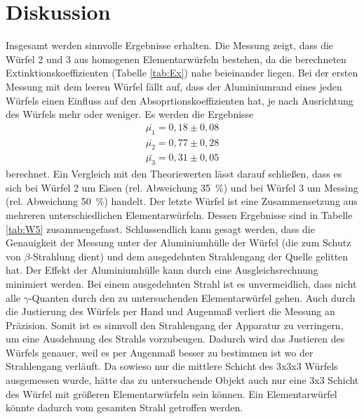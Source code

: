 \section{Diskussion}
\label{sec:Diskussion}
Insgesamt werden sinnvolle Ergebnisse erhalten.
Die Messung zeigt, dass die Würfel 2 und 3 aus homogenen Elementarwürfeln bestehen, da die berechneten Extinktionskoeffizienten (Tabelle \ref{tab:Ex}) nahe beieinander liegen.
Bei der ersten Messung mit dem leeren Würfel fällt auf, dass der Aluminiumrand eines jeden Würfels einen Einfluss auf den Absoprtionskoeffizienten hat, je nach Ausrichtung des Würfels mehr oder weniger.
Es werden die Ergebnisse 
\begin{align*}
    \bar{\mu_1}=0,18\pm0,08\\
    \bar{\mu_2}=0,77\pm0,28\\
    \bar{\mu_3}=0,31\pm0,05
\end{align*}
berechnet.
Ein Vergleich mit den Theoriewerten lässt darauf schließen, dass es sich bei Würfel 2 um Eisen (rel. Abweichung \SI{35}{\percent}) und bei Würfel 3 um Messing (rel. Abweichung \SI{50}{\percent}) handelt.
Der letzte Würfel ist eine Zusammensetzung aus mehreren unterschiedlichen Elementarwürfeln.
Dessen Ergebnisse sind in Tabelle \ref{tab:W5} zusammengefasst.
Schlussendlich kann gesagt werden, dass die Genauigkeit der Messung unter der Aluminiumhülle der Würfel (die zum Schutz von $\beta$-Strahlung dient) und dem ausgedehnten Strahlengang der Quelle gelitten hat.
Der Effekt der Aluminiumhülle kann durch eine Ausgleichsrechnung minimiert werden.
Bei einem ausgedehnten Strahl ist es unvermeidlich, dass nicht alle $\gamma$-Quanten durch den zu untersuchenden Elementarwürfel gehen.
Auch durch die Justierung des Würfels per Hand und Augenmaß verliert die Messung an Präzision.
Somit ist es sinnvoll den Strahlengang der Apparatur zu verringern, um eine Ausdehnung des Strahls vorzubeugen.
Dadurch wird das Justieren des Würfels genauer, weil es per Augenmaß besser zu bestimmen ist wo der Strahlengang verläuft.
Da sowieso nur die mittlere Schicht des 3x3x3 Würfels ausgemessen wurde, hätte das zu untersuchende Objekt auch nur eine 3x3 Schicht des Würfel mit größeren Elementarwürfeln sein können.
Ein Elementarwürfel könnte dadurch vom gesamten Strahl getroffen werden.
